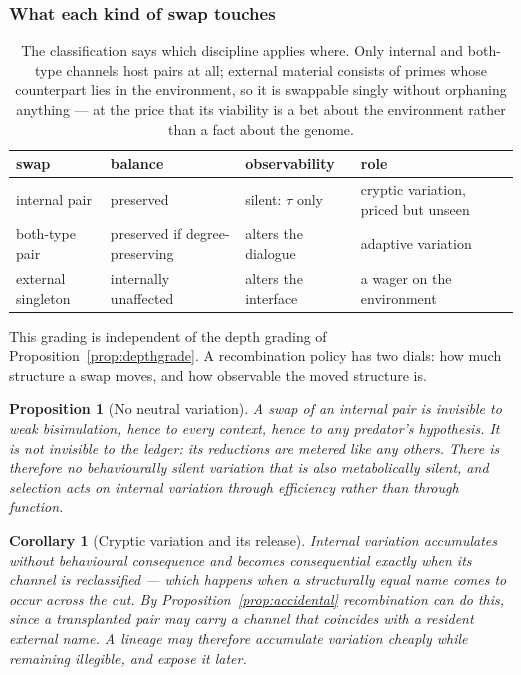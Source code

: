 \documentclass[11pt]{article}
\theoremstyle{plain}
\newtheorem{proposition}[theorem]{Proposition}
\newtheorem{corollary}[theorem]{Corollary}
\theoremstyle{definition}
\begin{document}
\subsubsection*{What each kind of swap touches}

\begin{table}[h]
\centering
\begin{tabular}{@{}llll@{}}
\toprule
\textbf{swap} & \textbf{balance} & \textbf{observability} & \textbf{role} \\
\midrule
internal pair & preserved & silent: $\tau$ only & cryptic variation, priced but unseen \\
both-type pair & preserved if degree-preserving & alters the dialogue & adaptive variation \\
external singleton & internally unaffected & alters the interface & a wager on the environment \\
\bottomrule
\end{tabular}
\caption{The classification says which discipline applies where. Only internal and both-type channels
host pairs at all; external material consists of primes whose counterpart lies in the environment, so
it is swappable singly without orphaning anything --- at the price that its viability is a bet about
the environment rather than a fact about the genome.}
\label{tab:swaptypes}
\end{table}

This grading is independent of the depth grading of Proposition~\ref{prop:depthgrade}. A recombination
policy has two dials: how much structure a swap moves, and how observable the moved structure is.

\begin{proposition}[No neutral variation]
\label{prop:noneutral}
A swap of an internal pair is invisible to weak bisimulation, hence to every context, hence to any
predator's hypothesis. It is not invisible to the ledger: its reductions are metered like any others.
There is therefore no behaviourally silent variation that is also metabolically silent, and selection
acts on internal variation through efficiency rather than through function.
\end{proposition}

\begin{corollary}[Cryptic variation and its release]
\label{cor:cryptic}
Internal variation accumulates without behavioural consequence and becomes consequential exactly when
its channel is reclassified --- which happens when a structurally equal name comes to occur across the
cut. By Proposition~\ref{prop:accidental} recombination can do this, since a transplanted pair may
carry a channel that coincides with a resident external name. A lineage may therefore accumulate
variation cheaply while remaining illegible, and expose it later.
\end{corollary}
\end{document}

